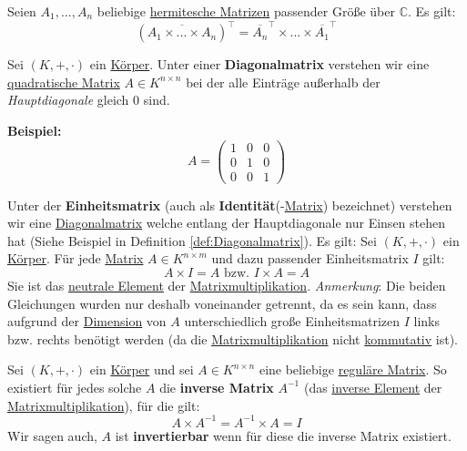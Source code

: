 \documentclass[../../main.tex]{subfiles}
\begin{document}
	\begin{theorem}
		Seien $A_1,...,A_n$ beliebige \hyperref[def:HermitescheMatrix]{hermitesche Matrizen} passender Größe über $\mathbb{C}$. Es gilt: $$(\overline{A_1 \times ... \times A_n})^\top = \overline{A_n}^\top \times ... \times \overline{A_1}^\top$$
	\end{theorem}

	\begin{definition}[Diagonalmatrix]
		\label{def:Diagonalmatrix}
		Sei $(K,+,\cdot)$ ein \hyperref[def:Körper]{Körper}. Unter einer \textbf{Diagonalmatrix} verstehen wir eine \hyperref[def:QuadratischeMatrix]{quadratische Matrix} $A\in K^{n \times n}$ bei der alle Einträge außerhalb der \textit{Hauptdiagonale} gleich 0 sind. 
		
		\textbf{Beispiel:}
		$$
		A = \begin{pmatrix}
		1 & 0 & 0 \\
		0 & 1 & 0 \\
		0 & 0 & 1
		\end{pmatrix}
		$$
	\end{definition}

	\begin{definition}
		\label{def:Einheitsmatrix}
		\label{def:Identitätsmatrix}
		Unter der \textbf{Einheitsmatrix} (auch als \textbf{Identität}(-\hyperref[def:Matrix]{Matrix}) bezeichnet) verstehen wir eine \hyperref[def:Diagonalmatrix]{Diagonalmatrix} welche entlang der Hauptdiagonale nur Einsen stehen hat (Siehe Beispiel in Definition \ref{def:Diagonalmatrix}). Es gilt: Sei $(K,+,\cdot)$ ein \hyperref[def:Körper]{Körper}. Für jede \hyperref[def:Matrix]{Matrix} $A \in K^{n \times m}$ und dazu passender Einheitsmatrix $I$ gilt: $$A \times I = A \textrm{ bzw. } I \times A = A$$
		Sie ist das \hyperref[def:neutralesElement]{neutrale Element} der \hyperref[def:Matrixmultiplikation]{Matrixmultiplikation}. \textit{Anmerkung}: Die beiden Gleichungen wurden nur deshalb voneinander getrennt, da es sein kann, dass aufgrund der \hyperref[def:Dimension]{Dimension} von $A$ unterschiedlich große Einheitsmatrizen $I$ links bzw. rechts benötigt werden (da die \hyperref[def:Matrixmultiplikation]{Matrixmultiplikation} nicht \hyperref[def:kommutativ]{kommutativ} ist).
	\end{definition}

	\begin{definition}
		\label{def:InverseMatrix}
		\label{def:invertierbareMatrix}
		Sei $(K,+,\cdot)$ ein \hyperref[def:Körper]{Körper} und sei $A\in K^{n \times n}$ eine beliebige \hyperref[def:reguläreMatrix]{reguläre Matrix}. So existiert für jedes solche $A$ die \textbf{inverse Matrix} $A^{-1}$ (das \hyperref[def:inversesElement]{inverse Element} der \hyperref[def:Matrixmultiplikation]{Matrixmultiplikation}), für die gilt: $$A \times A^{-1} = A^{-1} \times A = I$$
		Wir sagen auch, $A$ ist \textbf{invertierbar} wenn für diese die inverse Matrix existiert. 
	\end{definition}
\end{document}
